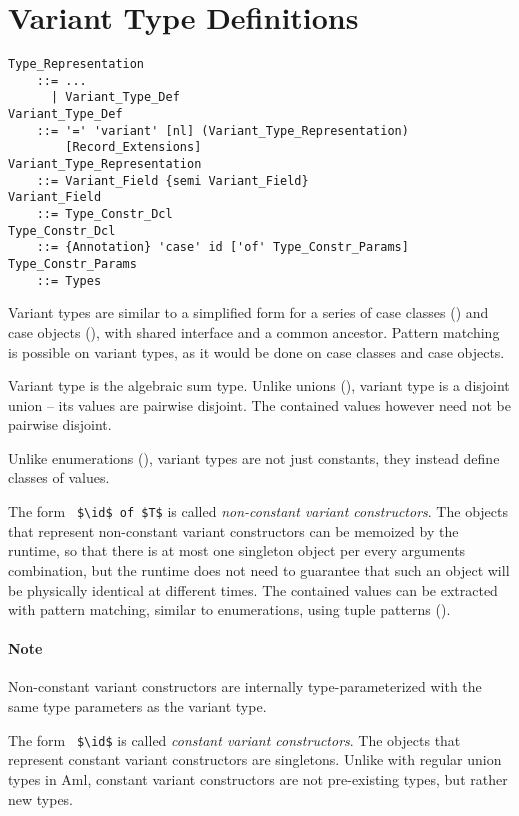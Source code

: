 \section{Variant Type Definitions}
\label{sec:variant-types}

\grammar\begin{lstlisting}
Type_Representation
    ::= ...
      | Variant_Type_Def
Variant_Type_Def
    ::= '=' 'variant' [nl] (Variant_Type_Representation) 
        [Record_Extensions]
Variant_Type_Representation 
    ::= Variant_Field {semi Variant_Field}
Variant_Field
    ::= Type_Constr_Dcl
Type_Constr_Dcl
    ::= {Annotation} 'case' id ['of' Type_Constr_Params]
Type_Constr_Params
    ::= Types
\end{lstlisting}

Variant types are similar to a simplified form for a series of case classes () and case objects (), with shared interface and a common ancestor. Pattern matching is possible on variant types, as it would be done on case classes and case objects. 

Variant type is the algebraic sum type. Unlike unions (), variant type is a disjoint union -- its values are pairwise disjoint. The contained values however need not be pairwise disjoint. 

Unlike enumerations (), variant types are not just constants, they instead define classes of values. 

The form ~\lstinline!$\id$ of $T$! is called {\em non-constant variant constructors}. The objects that represent non-constant variant constructors can be memoized by the runtime, so that there is at most one singleton object per every arguments combination, but the runtime does not need to guarantee that such an object will be physically identical at different times. The contained values can be extracted with pattern matching, similar to enumerations, using tuple patterns (). 

\paragraph{Note}
Non-constant variant constructors are internally type-parameterized with the same type parameters as the variant type. 

The form ~\lstinline!$\id$! is called {\em constant variant constructors}. The objects that represent constant variant constructors are singletons. Unlike with regular union types in Aml, constant variant constructors are not pre-existing types, but rather new types. 

